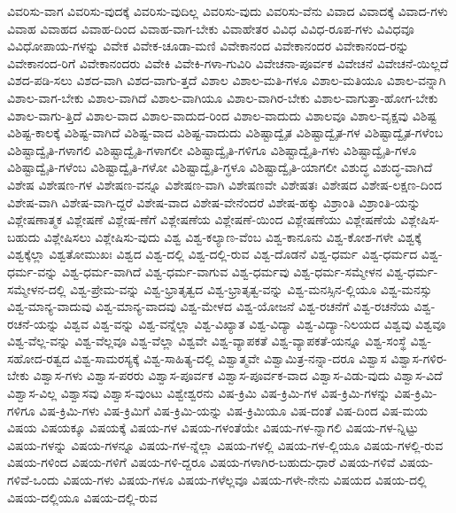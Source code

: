 {ವಿವರಿಸು-ವಾಗ
ವಿವರಿಸು-ವುದಕ್ಕೆ
ವಿವರಿಸು-ವುದಿಲ್ಲ
ವಿವರಿಸು-ವುದು
ವಿವರಿಸು-ವೆನು
ವಿವಾದ
ವಿವಾದಕ್ಕೆ
ವಿವಾದ-ಗಳು
ವಿವಾಹ
ವಿವಾಹದ
ವಿವಾಹ-ದಿಂದ
ವಿವಾಹ-ವಾಗ-ಬೇಕು
ವಿವಾಹೇತರ
ವಿವಿಧ
ವಿವಿಧ-ರೂಪ-ಗಳು
ವಿವಿಧವೂ
ವಿವಿಧೋಪಾಯ-ಗಳನ್ನು
ವಿವೇಕ
ವಿವೇಕ-ಚೂಡಾ-ಮಣಿ
ವಿವೇಕಾನಂದ
ವಿವೇಕಾನಂದರ
ವಿವೇಕಾನಂದ-ರನ್ನು
ವಿವೇಕಾನಂದ-ರಿಗೆ
ವಿವೇಕಾನಂದರು
ವಿವೇಕಿ
ವಿವೇಕಿ-ಗಳಾ-ಗುವಿರಿ
ವಿವೇಚನಾ-ಪೂರ್ವಕ
ವಿವೇಚನೆ
ವಿವೇಚನೆ-ಯಿಲ್ಲದೆ
ವಿಶದ-ಪಡಿ-ಸಲು
ವಿಶದ-ವಾಗಿ
ವಿಶದ-ವಾಗು-ತ್ತದೆ
ವಿಶಾಲ
ವಿಶಾಲ-ಮತಿ-ಗಳೂ
ವಿಶಾಲ-ಮತಿಯೂ
ವಿಶಾಲ-ವನ್ನಾಗಿ
ವಿಶಾಲ-ವಾಗ-ಬೇಕು
ವಿಶಾಲ-ವಾಗಿದೆ
ವಿಶಾಲ-ವಾಗಿಯೂ
ವಿಶಾಲ-ವಾಗಿರ-ಬೇಕು
ವಿಶಾಲ-ವಾಗುತ್ತಾ-ಹೋಗ-ಬೇಕು
ವಿಶಾಲ-ವಾಗು-ತ್ತಿದೆ
ವಿಶಾಲ-ವಾದ
ವಿಶಾಲ-ವಾದುದ-ರಿಂದ
ವಿಶಾಲ-ವಾದುದು
ವಿಶಾಲವೂ
ವಿಶಾಲ-ವೃಕ್ಷವು
ವಿಶಿಷ್ಟ
ವಿಶಿಷ್ಟ-ಕಾಲಕ್ಕೆ
ವಿಶಿಷ್ಟ-ವಾಗಿದೆ
ವಿಶಿಷ್ಟ-ವಾದ
ವಿಶಿಷ್ಟ-ವಾದುದು
ವಿಶಿಷ್ಟಾದ್ವೈತ
ವಿಶಿಷ್ಟಾದ್ವೈತ-ಗಳ
ವಿಶಿಷ್ಟಾದ್ವೈತ-ಗಳೆಂಬ
ವಿಶಿಷ್ಟಾದ್ವೈತಿ-ಗಳಾಗಲಿ
ವಿಶಿಷ್ಟಾದ್ವೈತಿ-ಗಳಾಗಲೀ
ವಿಶಿಷ್ಟಾದ್ವೈತಿ-ಗಳಿಗೂ
ವಿಶಿಷ್ಟಾದ್ವೈತಿ-ಗಳು
ವಿಶಿಷ್ಟಾದ್ವೈತಿ-ಗಳೂ
ವಿಶಿಷ್ಟಾದ್ವೈತಿ-ಗಳೆಂಬ
ವಿಶಿಷ್ಟಾದ್ವೈತಿ-ಗಳೋ
ವಿಶಿಷ್ಟಾದ್ವೈತಿ-ಗ್ಧಳೂ
ವಿಶಿಷ್ಟಾದ್ವೈತಿ-ಯಾಗಲೀ
ವಿಶುದ್ಧ
ವಿಶುದ್ಧ-ವಾಗಿದೆ
ವಿಶೇಷ
ವಿಶೇಷಣ-ಗಳ
ವಿಶೇಷಣ-ವನ್ನೂ
ವಿಶೇಷಣ-ವಾಗಿ
ವಿಶೇಷಣವೇ
ವಿಶೇಷತಃ
ವಿಶೇಷದ
ವಿಶೇಷ-ಲಕ್ಷಣ-ದಿಂದ
ವಿಶೇಷ-ವಾಗಿ
ವಿಶೇಷ-ವಾಗಿ-ದ್ದರೆ
ವಿಶೇಷ-ವಾದ
ವಿಶೇಷ-ವೇನೆಂದರೆ
ವಿಶೇಷ-ಹಕ್ಕು
ವಿಶ್ರಾಂತಿ
ವಿಶ್ರಾಂತಿ-ಯನ್ನು
ವಿಶ್ಲೇಷಣಾತ್ಮಕ
ವಿಶ್ಲೇಷಣೆ
ವಿಶ್ಲೇಷ-ಣೆಗೆ
ವಿಶ್ಲೇಷಣೆಯ
ವಿಶ್ಲೇಷಣೆ-ಯಿಂದ
ವಿಶ್ಲೇಷಣೆಯು
ವಿಶ್ಲೇಷಣೆಯೆ
ವಿಶ್ಲೇಷಿಸ-ಬಹುದು
ವಿಶ್ಲೇಷಿಸಲು
ವಿಶ್ಲೇಷಿಸು-ವುದು
ವಿಶ್ವ
ವಿಶ್ವ-ಕಲ್ಯಾಣ-ವೆಂಬ
ವಿಶ್ವ-ಕಾನೂನು
ವಿಶ್ವ-ಕೋಶ-ಗಳೇ
ವಿಶ್ವಕ್ಕೆ
ವಿಶ್ವಕ್ಕೆಲ್ಲಾ
ವಿಶ್ವತೋಮುಖಃ
ವಿಶ್ವದ
ವಿಶ್ವ-ದಲ್ಲಿ
ವಿಶ್ವ-ದಲ್ಲಿ-ರುವ
ವಿಶ್ವ-ದೊಡನೆ
ವಿಶ್ವ-ಧರ್ಮ
ವಿಶ್ವ-ಧರ್ಮದ
ವಿಶ್ವ-ಧರ್ಮ-ವನ್ನು
ವಿಶ್ವ-ಧರ್ಮ-ವಾಗಿದೆ
ವಿಶ್ವ-ಧರ್ಮ-ವಾಗುವ
ವಿಶ್ವ-ಧರ್ಮವು
ವಿಶ್ವ-ಧರ್ಮ-ಸಮ್ಮೇಳನ
ವಿಶ್ವ-ಧರ್ಮ-ಸಮ್ಮೇಳನ-ದಲ್ಲಿ
ವಿಶ್ವ-ಪ್ರೇಮ-ವನ್ನು
ವಿಶ್ವ-ಭ್ರಾತೃತ್ವದ
ವಿಶ್ವ-ಭ್ರಾತೃತ್ವ-ವನ್ನು
ವಿಶ್ವ-ಮನಸ್ಸಿನ-ಲ್ಲಿಯೂ
ವಿಶ್ವ-ಮನಸ್ಸು
ವಿಶ್ವ-ಮಾನ್ಯ-ವಾದುವು
ವಿಶ್ವ-ಮಾನ್ಯ-ವಾದವು
ವಿಶ್ವ-ಮೇಳದ
ವಿಶ್ವ-ಯೋಜನೆ
ವಿಶ್ವ-ರಚನೆಗೆ
ವಿಶ್ವ-ರಚನೆಯ
ವಿಶ್ವ-ರಚನೆ-ಯನ್ನು
ವಿಶ್ವವ
ವಿಶ್ವ-ವನ್ನು
ವಿಶ್ವ-ವನ್ನೆಲ್ಲಾ
ವಿಶ್ವ-ವಿಖ್ಯಾತ
ವಿಶ್ವ-ವಿದ್ಯಾ
ವಿಶ್ವ-ವಿದ್ಯಾ-ನಿಲಯದ
ವಿಶ್ವವು
ವಿಶ್ವವೂ
ವಿಶ್ವ-ವೆಲ್ಲ-ವನ್ನು
ವಿಶ್ವ-ವೆಲ್ಲವೂ
ವಿಶ್ವ-ವೆಲ್ಲಾ
ವಿಶ್ವವೇ
ವಿಶ್ವ-ವ್ಯಾಪಕತೆ
ವಿಶ್ವ-ವ್ಯಾಪಕತೆ-ಯನ್ನೂ
ವಿಶ್ವ-ಸಂಸ್ಥೆ
ವಿಶ್ವ-ಸಹೋದ-ರತ್ವದ
ವಿಶ್ವ-ಸಾಮರಸ್ಯಕ್ಕೆ
ವಿಶ್ವ-ಸಾಹಿತ್ಯ-ದಲ್ಲಿ
ವಿಶ್ವಾತ್ಮವೇ
ವಿಶ್ವಾಮಿತ್ರ-ನನ್ನಾ-ದರೂ
ವಿಶ್ವಾಸ
ವಿಶ್ವಾಸ-ಗಳಿರ-ಬೇಕು
ವಿಶ್ವಾಸ-ಗಳು
ವಿಶ್ವಾಸ-ಪರರು
ವಿಶ್ವಾಸ-ಪೂರ್ವಕ
ವಿಶ್ವಾಸ-ಪೂರ್ವಕ-ವಾದ
ವಿಶ್ವಾಸ-ವಿಡು-ವುದು
ವಿಶ್ವಾಸ-ವಿದೆ
ವಿಶ್ವಾಸ-ವಿಲ್ಲ
ವಿಶ್ವಾಸವು
ವಿಶ್ವಾಸ-ವುಂಟು
ವಿಶ್ವೇಶ್ವರನು
ವಿಷ-ಕ್ರಿಮಿ
ವಿಷ-ಕ್ರಿಮಿ-ಗಳ
ವಿಷ-ಕ್ರಿಮಿ-ಗಳನ್ನು
ವಿಷ-ಕ್ರಿಮಿ-ಗಳಿಗೂ
ವಿಷ-ಕ್ರಿಮಿ-ಗಳು
ವಿಷ-ಕ್ರಿಮಿಗೆ
ವಿಷ-ಕ್ರಿಮಿ-ಯನ್ನು
ವಿಷ-ಕ್ರಿಮಿಯೂ
ವಿಷ-ದಂತೆ
ವಿಷ-ದಿಂದ
ವಿಷ-ಮಯ
ವಿಷಯ
ವಿಷಯಕ್ಕೂ
ವಿಷಯಕ್ಕೆ
ವಿಷಯ-ಗಳ
ವಿಷಯ-ಗಳಂತೆಯೇ
ವಿಷಯ-ಗಳ-ನ್ನಾಗಲಿ
ವಿಷಯ-ಗಳ-ನ್ನಿಟ್ಟು
ವಿಷಯ-ಗಳನ್ನು
ವಿಷಯ-ಗಳನ್ನೂ
ವಿಷಯ-ಗಳ-ನ್ನೆಲ್ಲಾ
ವಿಷಯ-ಗಳಲ್ಲಿ
ವಿಷಯ-ಗಳ-ಲ್ಲಿಯೂ
ವಿಷಯ-ಗಳಲ್ಲಿ-ರುವ
ವಿಷಯ-ಗಳಿಂದ
ವಿಷಯ-ಗಳಿಗೆ
ವಿಷಯ-ಗಳಿ-ದ್ದರೂ
ವಿಷಯ-ಗಳಾಗಿರ-ಬಹುದು-ಧಾರೆ
ವಿಷಯ-ಗಳಿವೆ
ವಿಷಯ-ಗಳಿವೆ-ಒಂದು
ವಿಷಯ-ಗಳು
ವಿಷಯ-ಗಳೂ
ವಿಷಯ-ಗಳೆಲ್ಲವೂ
ವಿಷಯ-ಗಳೇ-ನೇನು
ವಿಷಯದ
ವಿಷಯ-ದಲ್ಲಿ
ವಿಷಯ-ದಲ್ಲಿಯೂ
ವಿಷಯ-ದಲ್ಲಿ-ರುವ
}
